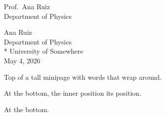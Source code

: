 \documentclass{article}
\begin{document}
\noindent
\begin{minipage}[t]{0.5\textwidth}
Prof.\ Ana Ruiz\\
Department of Physics
\end{minipage}%
\begin{minipage}[t]{0.5\textwidth}
\raggedleft
Ana Ruiz\\
Department of Physics\hspace{3pt} \\*
University of Somewhere\\[2pt]
May 4, 2026\\
\end{minipage}

\begin{minipage}[b][3cm][t]{4cm}
\raggedright Top of a tall minipage with words that wrap around.
\end{minipage}\hfill
\begin{minipage}[b][2cm]{4cm}
At the bottom, the inner position its position.
\end{minipage}\hfill
\begin{minipage}[t][2cm][b]{4cm}
At the bottom.
\end{minipage}
\end{document}
